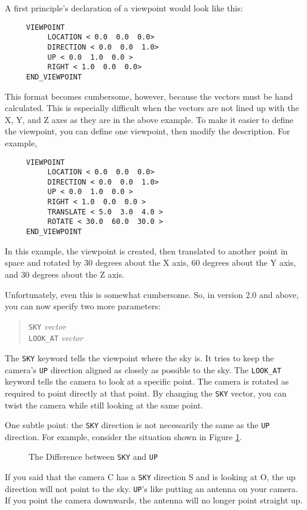 A first principle's declaration of a viewpoint would look like this:
\begin{verbatim}
     VIEWPOINT
          LOCATION < 0.0  0.0  0.0>
          DIRECTION < 0.0  0.0  1.0>
          UP < 0.0  1.0  0.0 >
          RIGHT < 1.0  0.0  0.0>
     END_VIEWPOINT
\end{verbatim}
This format becomes cumbersome, however, because the vectors must be hand
calculated.  This is especially difficult when the vectors are not lined up
with the X, Y, and Z axes as they are in the above example. To make it easier
to define the viewpoint, you can define one viewpoint, then modify the
description.  For example,
\begin{verbatim}
     VIEWPOINT
          LOCATION < 0.0  0.0  0.0>
          DIRECTION < 0.0  0.0  1.0>
          UP < 0.0  1.0  0.0 >
          RIGHT < 1.0  0.0  0.0 >
          TRANSLATE < 5.0  3.0  4.0 >
          ROTATE < 30.0  60.0  30.0 >
     END_VIEWPOINT
\end{verbatim}
In this example, the viewpoint is created, then translated to another point in
space and rotated by 30 degrees about the X axis, 60 degrees about the Y axis,
and 30 degrees about the Z axis.

Unfortunately, even this is somewhat cumbersome.  So, in version 2.0 and
above, you can now specify two more parameters:

\begin{verse}
{\tt SKY} {\em vector} \\
{\tt LOOK_AT} {\em vector}
\end{verse}

The {\tt SKY} keyword tells the viewpoint where the sky
is. It tries
to keep the camera's {\tt UP} direction aligned as closely as possible
to the sky. The {\tt LOOK_AT} keyword tells the
camera to look at a
specific point.  The camera is rotated as required to point directly
at that point.  By changing the {\tt SKY} vector, you can twist the
camera while still looking at the same point.

One subtle point: the {\tt SKY} direction is not necessarily the same
as the {\tt UP} direction. For example, consider the situation shown
in Figure \ref{skyup}.
\begin{figure}[htbp]
\begin{centering}

\caption{The Difference between {\tt SKY} and {\tt UP}}
\label{skyup}
\end{centering}
\end{figure}
If you said that the camera C has a {\tt SKY} direction S and is
looking at O, the up direction will not point to the sky.  {\tt UP}'s
like putting an antenna on your camera.  If you point the camera
downwards, the antenna will no longer point straight up.

